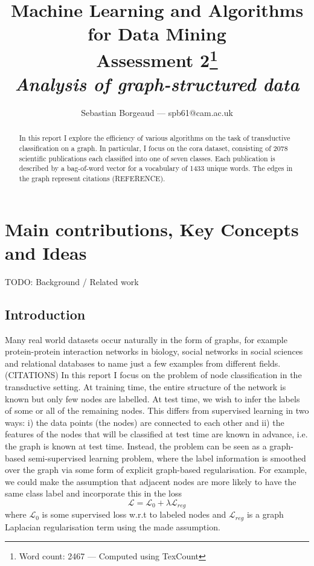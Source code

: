 \documentclass[12pt]{article}
\title{{\small{Machine Learning and Algorithms for Data Mining} \\
Assessment 2\footnote{Word count: 2467 --- Computed using TexCount}} \\
\textit{Analysis of graph-structured data}}
\author{Sebastian Borgeaud --- spb61@cam.ac.uk}
\theoremstyle{definition}
\begin{document}
\maketitle

\begin{abstract}
	In this report I explore the efficiency of various algorithms on the task of transductive classification on a graph. In particular, I focus on the cora dataset, consisting of 2078 scientific publications each classified into one of seven classes. Each publication is described by a bag-of-word vector for a vocabulary of 1433 unique words. The edges in the graph represent citations (REFERENCE).
	\end{abstract}

\section{Main contributions, Key Concepts and Ideas}

TODO: Background / Related work

\subsection{Introduction}
Many real world datasets occur naturally in the form of graphs, for example protein-protein interaction networks in biology, social networks in social sciences and relational databases to name just a few examples from different fields. (CITATIONS) In this report I focus on the problem of node classification in the transductive setting. At training time, the entire structure of the network is known but only few nodes are labelled. At test time, we wish to infer the labels of some or all of the remaining nodes. This differs from supervised learning in two ways: i) the data points (the nodes) are connected to each other and ii) the features of the nodes that will be classified at test time are known in advance, i.e. the graph is known at test time. 
Instead, the problem can be seen as a graph-based semi-supervised learning problem, where the label information is smoothed over the graph via some form of explicit graph-based regularisation. For example, we could make the assumption that adjacent nodes are more likely to have the same class label and incorporate this in the loss
\begin{equation}
	\mathcal{L} = \mathcal{L}_0 + \lambda \mathcal{L}_{\mathit{reg}}
\end{equation}
where $\mathcal{L}_0$ is some supervised loss w.r.t to labeled nodes and $\mathcal{L}_{\mathit{reg}}$ is a graph Laplacian regularisation term using the made assumption.
\end{document}
